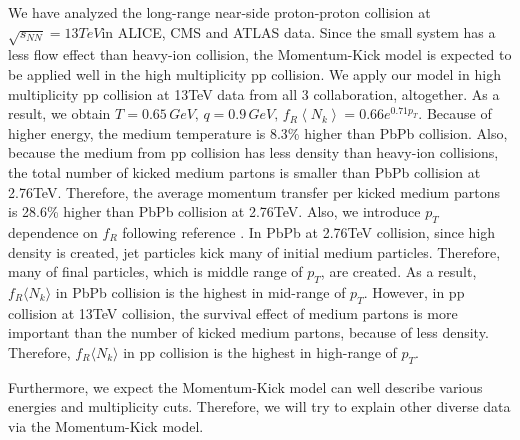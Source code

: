 \documentclass[jkps,fleqn,showpacs,showkeys]{revtex4-2}
\begin{document}
We have analyzed the long-range near-side proton-proton collision at $\sqrt{s_{NN}}=13TeV $in ALICE, CMS and ATLAS data. 
Since the small system has a less flow effect than heavy-ion collision, the Momentum-Kick model is expected to be applied well in the high multiplicity pp collision. 
We apply our model in high multiplicity pp collision at 13TeV data from all 3 collaboration, altogether. 
As a result, we obtain $T=0.65\, GeV,\, q=0.9\, GeV,\, f_R\left\langle N_k\right\rangle=0.66e^{0.71p_T}$.
Because of higher energy, the medium temperature is 8.3\% higher than PbPb collision.
Also, because the medium from pp collision has less density than heavy-ion collisions, the total number of kicked medium partons is smaller than PbPb collision at 2.76TeV.
Therefore, the average momentum transfer per kicked medium partons is 28.6\% higher than PbPb collision at 2.76TeV.
Also, we introduce $p_T$ dependence on $f_R$ following reference \cite{PbPb}.
In PbPb at 2.76TeV collision, since high density is created, jet particles kick many of initial medium particles.
Therefore, many of final particles, which is middle range of $p_T$, are created.
As a result, $f_R \langle N_k \rangle$ in PbPb collision is the highest in mid-range of $p_T$.
However, in pp collision at 13TeV collision, the survival effect of medium partons is more important than the number of kicked medium partons, because of less density.
Therefore, $f_R \langle N_k \rangle$ in pp collision is the highest in high-range of $p_T$.

Furthermore, we expect the Momentum-Kick model can well describe various energies and multiplicity cuts. 
Therefore, we will try to explain other diverse data via the Momentum-Kick model.


% 

\end{document}
